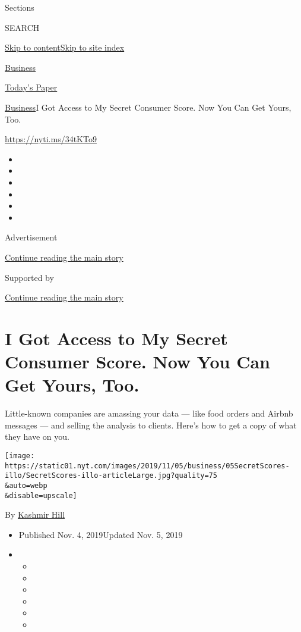 Sections

SEARCH

\protect\hyperlink{site-content}{Skip to
content}\protect\hyperlink{site-index}{Skip to site index}

\href{https://www.nytimes.com/section/business}{Business}

\href{https://myaccount.nytimes.com/auth/login?response_type=cookie\&client_id=vi}{}

\href{https://www.nytimes.com/section/todayspaper}{Today's Paper}

\href{/section/business}{Business}\textbar{}I Got Access to My Secret
Consumer Score. Now You Can Get Yours, Too.

\href{https://nyti.ms/34tKTo9}{https://nyti.ms/34tKTo9}

\begin{itemize}
\item
\item
\item
\item
\item
\item
\end{itemize}

Advertisement

\protect\hyperlink{after-top}{Continue reading the main story}

Supported by

\protect\hyperlink{after-sponsor}{Continue reading the main story}

\hypertarget{i-got-access-to-my-secret-consumer-score-now-you-can-get-yours-too}{%
\section{I Got Access to My Secret Consumer Score. Now You Can Get
Yours,
Too.}\label{i-got-access-to-my-secret-consumer-score-now-you-can-get-yours-too}}

Little-known companies are amassing your data --- like food orders and
Airbnb messages --- and selling the analysis to clients. Here's how to
get a copy of what they have on you.

\texttt{[image: https://static01.nyt.com/images/2019/11/05/business/05SecretScores-illo/SecretScores-illo-articleLarge.jpg?quality=75\\\&auto=webp\\\&disable=upscale]}

By \href{https://www.nytimes.com/by/kashmir-hill}{Kashmir Hill}

\begin{itemize}
\item
  Published Nov. 4, 2019Updated Nov. 5, 2019
\item
  \begin{itemize}
  \item
  \item
  \item
  \item
  \item
  \item
  \end{itemize}
\end{itemize}

